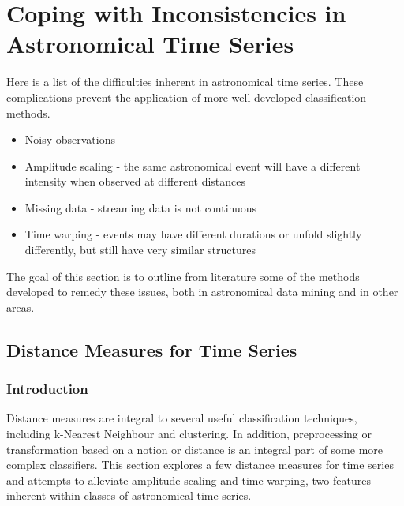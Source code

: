 \documentclass[11pt]{article}
\begin{document}

	\section{Coping with Inconsistencies in Astronomical Time Series}
	Here is a list of the difficulties inherent in astronomical time series. These complications prevent the application of more well developed classification methods.
	\begin{itemize}
		\item Noisy observations 
		\item Amplitude scaling - the same astronomical event will have a different intensity when observed at different distances
		\item Missing data - streaming data is not continuous
		\item Time warping - events may have different durations or unfold slightly differently, but still have very similar structures
	\end{itemize}
	The goal of this section is to outline from literature some of the methods developed to remedy these issues, both in astronomical data mining and in other areas.
	
	\subsection{Distance Measures for Time Series}
	\subsubsection{Introduction}
	Distance measures are integral to several useful classification techniques, including k-Nearest Neighbour and clustering. In addition, preprocessing or transformation based on a notion or distance is an integral part of some more complex classifiers. This section explores a few distance measures for time series and attempts to alleviate amplitude scaling and time warping, two features inherent within classes of astronomical time series.
\end{document}

